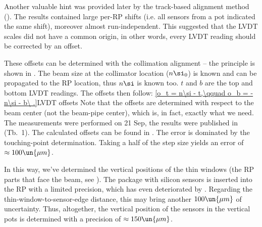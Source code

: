 
Another valuable hint was provided later by the track-based alignment method (). The results contained large per-RP shifts (i.e. all sensors from a pot indicated the same shift), moreover almost run-independent. This suggested that the LVDT scales did not have a common origin, in other words, every LVDT reading should be corrected by an offset. 

These offsets can be determined with the collimation alignment -- the principle is shown in . The beam size at the collimator location ($n\si_0$) is known and can be propagated to the RP location, thus $n\si$ is known too. $t$ and $b$ are the top and bottom LVDT readings. The offsets then follow:
\eqref{o_t = n\si - t,\qquad o_b = -n\si - b\ .}{LVDT offsets}
Note that the offsets are determined with respect to the beam center (not the beam-pipe center), which is, in fact, exactly what we need. The measurements were performed on 21 Sep, the results were published in  (Tb.~1). The calculated offsets can be found in . The error is dominated by the touching-point determination. Taking a half of the step size yields an error of $\approx 100\un{\mu m}$.



In this way, we've determined the vertical positions of the thin windows (the RP parts that face the beam, see ). The package with silicon sensors is inserted into the RP with a limited precision, which has even deteriorated by . Regarding the thin-window-to-sensor-edge distance, this may bring another $100\un{\mu m}$ of uncertainty. Thus, altogether, the vertical position of the sensors in the vertical pots is determined with a precision of $\approx 150\un{\mu m}$.

